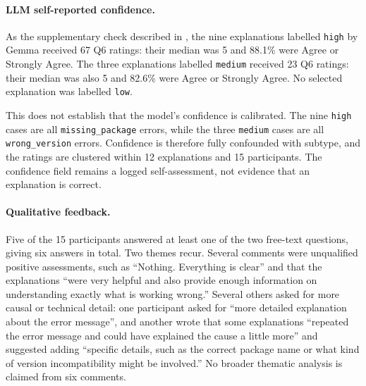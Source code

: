 \paragraph{LLM self-reported confidence.}
\label{sec:v-human-eval-confidence}
As the supplementary check described in
, the nine explanations labelled
\texttt{high} by Gemma received 67 Q6 ratings: their median was 5 and
88.1\% were Agree or Strongly Agree. The three explanations labelled
\texttt{medium} received 23 Q6 ratings: their median was also 5 and
82.6\% were Agree or Strongly Agree. No selected explanation was labelled
\texttt{low}.

This does not establish that the model's confidence is calibrated. The nine
\texttt{high} cases are all \texttt{missing\_package} errors, while the
three \texttt{medium} cases are all \texttt{wrong\_version} errors.
Confidence is therefore fully confounded with subtype, and the ratings are
clustered within 12 explanations and 15 participants. The confidence field
remains a logged self-assessment, not evidence that an explanation is
correct.

\paragraph{Qualitative feedback.} Five of the 15 participants answered at
least one of the two free-text questions, giving six answers in total.
Two themes recur. Several comments were unqualified positive assessments,
such as ``Nothing. Everything is clear'' and that the explanations ``were
very helpful and also provide enough information on understanding exactly
what is working wrong.'' Several others asked for more causal or
technical detail: one participant asked for ``more detailed explanation
about the error message'', and another wrote that some explanations
``repeated the error message and could have explained the cause a little
more'' and suggested adding ``specific details, such as the correct
package name or what kind of version incompatibility might be
involved.'' No broader thematic analysis is claimed from six comments.

